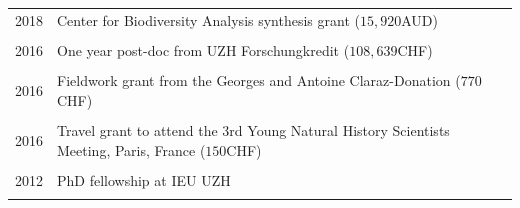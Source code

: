 \documentclass[a4paper,10pt]{article} %
\begin{document}
\subsection*{}
\begin{tabular}{p{4cm}|p{11cm}}
\hfill \textsc{2018} &  Center for Biodiversity Analysis synthesis grant ($15,920$AUD)\\
\multicolumn{2}{c}{} \\
\hfill \textsc{2016} & One year post-doc from UZH Forschungkredit ($108,639$CHF)\\
\multicolumn{2}{c}{} \\
\hfill \textsc{2016} & Fieldwork grant from the Georges and Antoine Claraz-Donation ($770$CHF)\\
\multicolumn{2}{c}{} \\
\hfill \textsc{2016} & Travel grant to attend the 3rd Young Natural History Scientists Meeting, Paris, France ($150$CHF)\\
\multicolumn{2}{c}{} \\
\hfill \textsc{2012} & PhD fellowship at IEU UZH\\
\multicolumn{2}{c}{} \\
\end{tabular}
\end{document}
